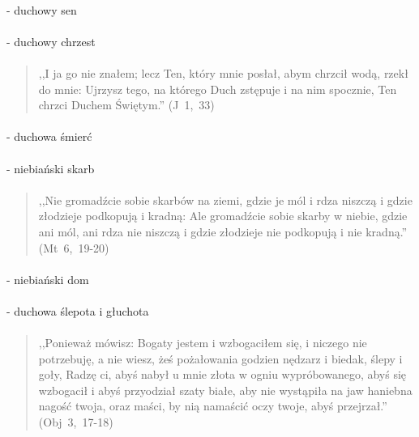 \documentclass[10pt,a4paper,oneside]{article}
\begin{document}
\paragraph{}
- duchowy sen
\paragraph{}
- duchowy chrzest
\paragraph{}
\begin{quote}
,,I ja go nie znałem; lecz Ten, który mnie posłał, abym chrzcił wodą, rzekł do mnie: Ujrzysz tego, na którego Duch zstępuje i na nim spocznie, Ten chrzci Duchem Świętym.'' \mbox{(J 1, 33)}
\end{quote}
\paragraph{}
- duchowa śmierć
\paragraph{}
- niebiański skarb
\paragraph{}
\begin{quote}
,,Nie gromadźcie sobie skarbów na ziemi, gdzie je mól i rdza niszczą i gdzie złodzieje podkopują i kradną: Ale gromadźcie sobie skarby w niebie, gdzie ani mól, ani rdza nie niszczą i gdzie złodzieje nie podkopują i nie kradną.'' \mbox{(Mt 6, 19-20)}
\end{quote}
\paragraph{}
- niebiański dom
\paragraph{}
- duchowa ślepota i głuchota
\paragraph{}
\begin{quote}
,,Ponieważ mówisz: Bogaty jestem i wzbogaciłem się, i niczego nie potrzebuję, a nie wiesz, żeś pożałowania godzien nędzarz i biedak, ślepy i goły, Radzę ci, abyś nabył u mnie złota w ogniu wypróbowanego, abyś się wzbogacił i abyś przyodział szaty białe, aby nie wystąpiła na jaw haniebna nagość twoja, oraz maści, by nią namaścić oczy twoje, abyś przejrzał.'' \mbox{(Obj 3, 17-18)}
\end{quote}
\end{document}
